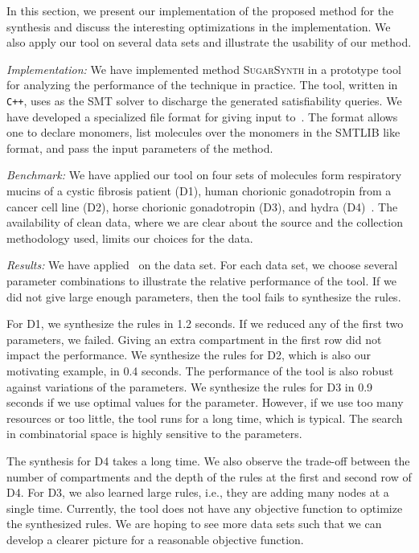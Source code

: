 In this section, we  present our implementation of the proposed method for the synthesis
and discuss the interesting optimizations in the implementation.
%
We also apply our tool on several data sets and illustrate the usability of our method.

{\em Implementation:} 
We have implemented method \textsc{SugarSynth} in a prototype tool {\ourtool} for
analyzing the performance of the technique in practice.
%
The tool, written in {\tt C++}, uses {\zthree}\cite{z3} as the SMT solver
to discharge the generated satisfiability queries.
%
We have developed a specialized file format for giving input to~\ourtool.
%
The format allows one to declare monomers, list molecules over the monomers
in the SMTLIB like format,
and pass the input parameters of the method.


{\em Benchmark: }
We have applied our tool on four sets of molecules form
respiratory mucins of a cystic fibrosis patient (D1),
human chorionic gonadotropin from a cancer cell line (D2), horse chorionic gonadotropin (D3), and
hydra (D4)~\cite{Jaiman2018,hydra}.
The availability of clean data, where we are clear about the source and the collection
methodology used, limits our choices for the data.



{\em Results:} We have applied \ourtool~on the data set. For each data set, we choose several
parameter combinations to illustrate the relative performance of the tool.
If we did not give large enough parameters, then the tool fails to synthesize the rules.

For D1, we synthesize the rules in 1.2 seconds. If we reduced any of the first
two parameters, we failed.
Giving an extra compartment in the first row did not impact the performance.
We synthesize the rules for D2, which is also our motivating example, in 0.4 seconds.
The performance of the tool is also robust against variations of the parameters.
We synthesize the rules for D3 in 0.9 seconds if we use optimal values for the parameter.
However, if we use too many resources or too little, the tool runs for a long time,
which is typical. The search in combinatorial space is highly sensitive to the parameters.

The synthesis for D4 takes a long time. We also observe the trade-off between the number of compartments
and the depth of the rules at the first and second row of D4.
For D3, we also learned large rules, i.e., they are adding many nodes at a single time.
Currently, the tool does not have any objective function to optimize the synthesized rules.
We are hoping to see more data sets such that we can develop a clearer picture
for a reasonable objective function.


